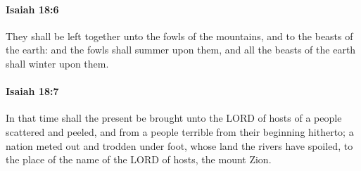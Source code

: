 		\paragraph{Isaiah 18:6} %
			\label{ISAIAH-18-6}

			They shall be left together unto the fowls of the mountains, and to the beasts of the earth: and the fowls shall summer upon them, and all the beasts of the earth shall winter upon them.


		\paragraph{Isaiah 18:7} %
			\label{ISAIAH-18-7}

			In that time shall the present be brought unto the LORD of hosts of a people scattered and peeled, and from a people terrible from their beginning hitherto; a nation meted out and trodden under foot, whose land the rivers have spoiled, to the place of the name of the LORD of hosts, the mount Zion.

